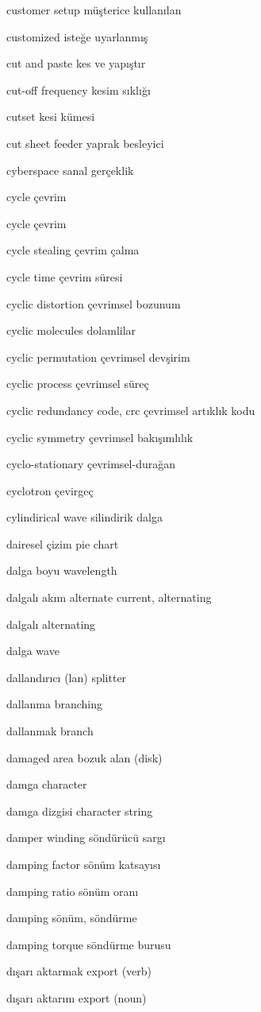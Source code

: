 \documentclass[12pt,fleqn]{article}\usepackage{../../common}
\begin{document}
customer setup müşterice kullanılan

customized isteğe uyarlanmış

cut and paste kes ve yapıştır

cut-off frequency kesim sıklığı

cutset kesi kümesi

cut sheet feeder yaprak besleyici

cyberspace sanal gerçeklik

cycle çevrim

cycle çevrim

cycle stealing çevrim çalma

cycle time çevrim süresi

cyclic distortion çevrimsel bozunum

cyclic molecules dolamlilar

cyclic permutation çevrimsel devşirim

cyclic process çevrimsel süreç

cyclic redundancy code, crc çevrimsel artıklık kodu

cyclic symmetry çevrimsel bakışımlılık

cyclo-stationary çevrimsel-durağan

cyclotron çevirgeç

cylindirical wave silindirik dalga

dairesel çizim pie chart

dalga boyu wavelength

dalgalı akım alternate current, alternating

dalgalı alternating

dalga wave

dallandırıcı (lan) splitter

dallanma branching

dallanmak branch

damaged area bozuk alan (disk)

damga character

damga dizgisi character string

damper winding söndürücü sargı

damping factor sönüm katsayısı

damping ratio sönüm oranı

damping sönüm, söndürme

damping torque söndürme burusu

dışarı aktarmak export (verb)

dışarı aktarım export (noun)
\end{document}
